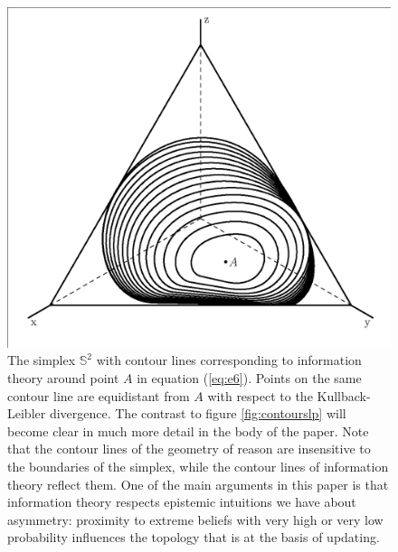 \documentclass[12pt]{article}
\begin{document}
\begin{figure}[ht]
  \begin{flushright}
    \begin{minipage}[h]{.7\linewidth}
      \includegraphics[width=\textwidth]{crj.eps}
      \caption{\footnotesize The simplex $\mathbb{S}^{2}$ with contour
        lines corresponding to information theory around point $A$ in
        equation (\ref{eq:e6}). Points on the same contour line are
        equidistant from $A$ with respect to the Kullback-Leibler
        divergence. The contrast to figure \ref{fig:contourslp} will
        become clear in much more detail in the body of the paper.
        Note that the contour lines of the geometry of reason are
        insensitive to the boundaries of the simplex, while the
        contour lines of information theory reflect them. One of the
        main arguments in this paper is that information theory
        respects epistemic intuitions we have about asymmetry:
        proximity to extreme beliefs with very high or very low
        probability influences the topology that is at the basis of
        updating.}
      \label{fig:contoursrj}
    \end{minipage}
  \end{flushright}
\end{figure}
\end{document}
